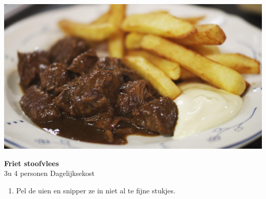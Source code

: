 \documentclass{article}
\newcommand{\recipesection}[1]{
    \LARGE\textcolor{darkcol}{\textbf{#1}}
}
\newcommand{\preparationitem}[1]{
    \normalsize\item{#1}
}
\newcommand{\recipetext}[1]{
    \textcolor{darkcol}{#1}
}
\begin{document}
\setlength{\columnsep}{2.2em}
\setlength{\columnseprule}{4pt}
\begin{paracol}{2}
\begin{leftcolumn}

\begin{center}
\includegraphics[width=\linewidth]{frietstoofvlees.jpg}%
\end{center}
\recipesection{Friet stoofvlees} %
\vspace{0pt}
\\
\textcolor{darkcol}{\normalsize\faClockO\recipetext
{3u} %
}
\textcolor{darkcol}{\normalsize\faUser\recipetext
{4 personen} %
}
\textcolor{darkcol}{
\normalsize\faNewspaperO\recipetext{Dagelijksekost} %
}
\vspace{5pt}
\begin{enumerate}[wide, labelwidth=!, labelindent=0pt]
        \preparationitem{Pel de uien en snipper ze in niet al te fijne stukjes.} %
        

\end{enumerate}
\end{leftcolumn}
\end{paracol}
\end{document}
